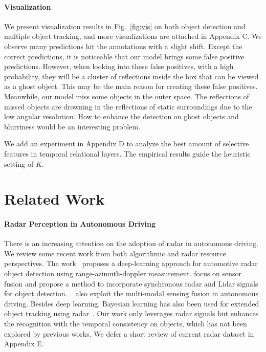 \documentclass[10pt,twocolumn,letterpaper]{article}
\begin{document}
\paragraph{Visualization}

We present visualization results in Fig.~\ref{fig:vis} on both object detection and multiple object tracking, and more visualizations are attached in Appendix C. We observe many predictions hit the annotations with a slight shift. Except the correct predictions, it is noticeable that our model brings some false positive predictions. However, when looking into these false positives, with a high probability, they will be a cluster of reflections inside the box that can be viewed as a ghost object. This may be the main reason for creating these false positives. Meanwhile, our model miss some objects in the outer space. The reflections of missed objects are drowning in the reflections of static surroundings due to the low angular resolution. How to enhance the detection on ghost objects and blurriness would be an interesting problem.

We add an experiment in Appendix D to analyze the best amount of selective features in temporal relational layers. The empirical results guide the heuristic setting of $K$.



\section{Related Work}\label{sec:relate}

\paragraph{Radar Perception in Autonomous Driving} There is an increasing attention on the adoption of radar in autonomous driving. We review some recent work from both algorithmic and radar resource perspectives. The work~\cite{major2019vehicle} proposes a deep-learning approach for automotive radar object detection using range-azimuth-doppler measurement. \cite{qian2021robust} focus on sensor fusion and propose a method to incorporate synchronous radar and Lidar signals for object detection. ~\cite{yang2020radarnet,lim2019radar} also exploit the multi-modal sensing fusion in autonomous driving. Besides deep learning, Bayesian learning has also been used for extended object tracking using radar~\cite{yao2021extended,xia2021learning}. Our work only leverages radar signals but enhances the recognition with the temporal consistency on objects, which has not been explored by previous works. We defer a short review of current radar dataset in Appendix E.
\end{document}

